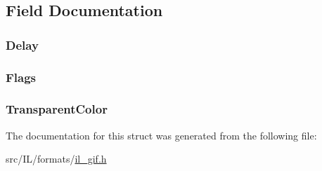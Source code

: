\subsection{Field Documentation}
\hypertarget{struct_gif_graphic_control_extension_adb5a7af2d1389cea804a943ad14130eb}{
\subsubsection[{Delay}]{ Delay}}\label{struct_gif_graphic_control_extension_adb5a7af2d1389cea804a943ad14130eb}
\hypertarget{struct_gif_graphic_control_extension_a4d4e57f611ec63d5199ee6ea1c56077e}{
\subsubsection[{Flags}]{ Flags}}\label{struct_gif_graphic_control_extension_a4d4e57f611ec63d5199ee6ea1c56077e}
\hypertarget{struct_gif_graphic_control_extension_abf65afac4e957a14fcdda071224c3f37}{
\subsubsection[{Transparent\-Color}]{ Transparent\-Color}}\label{struct_gif_graphic_control_extension_abf65afac4e957a14fcdda071224c3f37}


The documentation for this struct was generated from the following file\-:\begin{DoxyCompactItemize}
\item 
src/\-I\-L/formats/\hyperlink{il__gif_8h}{il\-\_\-gif.\-h}\end{DoxyCompactItemize}
